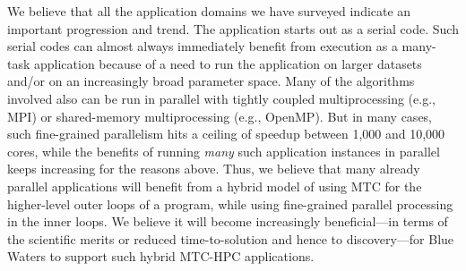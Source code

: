 \documentclass[10pt,letterpaper]{article}
\begin{document}
We believe that all the application domains we have surveyed indicate an 
important progression and trend.  The application starts out as a serial code. 
Such serial codes can almost always immediately benefit from execution as a 
many-task application because of a need to run the application on larger 
datasets and/or on an increasingly broad parameter space. Many of the algorithms 
involved also can be run in parallel with tightly coupled multiprocessing 
(e.g., MPI) or shared-memory multiprocessing (e.g., 
OpenMP). But in many cases, such fine-grained parallelism hits a ceiling of 
speedup between 1,000 and 10,000 cores, while the benefits of running 
{\em many} such application instances in parallel keeps increasing for the 
reasons above. Thus, we believe that many already parallel applications
will benefit from a hybrid model of using MTC for the 
higher-level outer loops of a program, while using fine-grained parallel processing 
in the inner loops.
We believe it will become increasingly beneficial---in terms of the scientific merits or reduced time-to-solution and hence to discovery---for Blue Waters to support such hybrid MTC-HPC applications.
\end{document}
